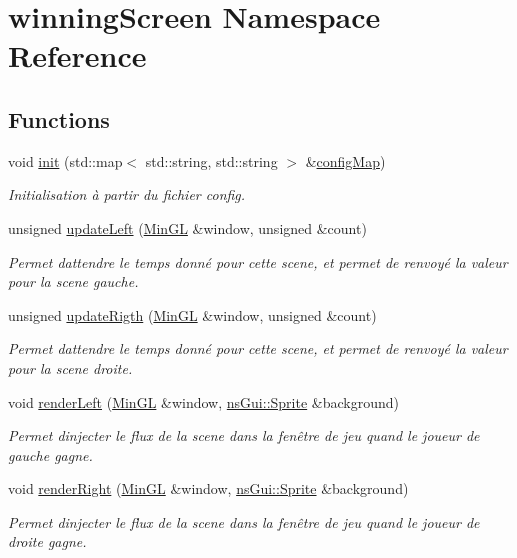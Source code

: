 \hypertarget{namespacewinning_screen}{}\section{winning\+Screen Namespace Reference}
\label{namespacewinning_screen}
\subsection*{Functions}
\begin{DoxyCompactItemize}
\item 
void \hyperlink{namespacewinning_screen_a95cf45487b70c59a93914ac096314d8b}{init} (std\+::map$<$ std\+::string, std\+::string $>$ \&\hyperlink{main_8cpp_ada2160bcc2082e595d02f0eb5a318dd5}{config\+Map})
\begin{DoxyCompactList}\small\item\em Initialisation à partir du fichier config. \end{DoxyCompactList}\item 
unsigned \hyperlink{namespacewinning_screen_a392125e6fbc00fe8aeff8a4ba2b1304f}{update\+Left} (\hyperlink{class_min_g_l}{Min\+GL} \&window, unsigned \&count)
\begin{DoxyCompactList}\small\item\em Permet d\textquotesingle{}attendre le temps donné pour cette scene, et permet de renvoyé la valeur pour la scene gauche. \end{DoxyCompactList}\item 
unsigned \hyperlink{namespacewinning_screen_a4fef86a5a7bc183a660e19b475a3d747}{update\+Rigth} (\hyperlink{class_min_g_l}{Min\+GL} \&window, unsigned \&count)
\begin{DoxyCompactList}\small\item\em Permet d\textquotesingle{}attendre le temps donné pour cette scene, et permet de renvoyé la valeur pour la scene droite. \end{DoxyCompactList}\item 
void \hyperlink{namespacewinning_screen_a191b2df2e95ec566a104e99436ceac14}{render\+Left} (\hyperlink{class_min_g_l}{Min\+GL} \&window, \hyperlink{classns_gui_1_1_sprite}{ns\+Gui\+::\+Sprite} \&background)
\begin{DoxyCompactList}\small\item\em Permet d\textquotesingle{}injecter le flux de la scene dans la fenêtre de jeu quand le joueur de gauche gagne. \end{DoxyCompactList}\item 
void \hyperlink{namespacewinning_screen_a60f106909188337ae1d68b386d783f10}{render\+Right} (\hyperlink{class_min_g_l}{Min\+GL} \&window, \hyperlink{classns_gui_1_1_sprite}{ns\+Gui\+::\+Sprite} \&background)
\begin{DoxyCompactList}\small\item\em Permet d\textquotesingle{}injecter le flux de la scene dans la fenêtre de jeu quand le joueur de droite gagne. \end{DoxyCompactList}\end{DoxyCompactItemize}


